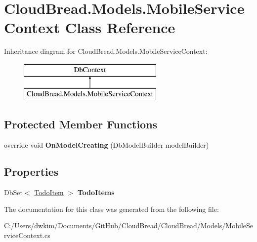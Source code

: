 \hypertarget{class_cloud_bread_1_1_models_1_1_mobile_service_context}{}\section{Cloud\+Bread.\+Models.\+Mobile\+Service\+Context Class Reference}
\label{class_cloud_bread_1_1_models_1_1_mobile_service_context}
Inheritance diagram for Cloud\+Bread.\+Models.\+Mobile\+Service\+Context\+:\begin{figure}[H]
\begin{center}
\leavevmode
\includegraphics[height=2.000000cm]{class_cloud_bread_1_1_models_1_1_mobile_service_context}
\end{center}
\end{figure}
\subsection*{Protected Member Functions}
\begin{DoxyCompactItemize}
\item 
override void {\bfseries On\+Model\+Creating} (Db\+Model\+Builder model\+Builder)\hypertarget{class_cloud_bread_1_1_models_1_1_mobile_service_context_a98c14d9e5b9403754d5b717f672ed77f}{}\label{class_cloud_bread_1_1_models_1_1_mobile_service_context_a98c14d9e5b9403754d5b717f672ed77f}

\end{DoxyCompactItemize}
\subsection*{Properties}
\begin{DoxyCompactItemize}
\item 
Db\+Set$<$ \hyperlink{class_cloud_bread_1_1_data_objects_1_1_todo_item}{Todo\+Item} $>$ {\bfseries Todo\+Items}\hypertarget{class_cloud_bread_1_1_models_1_1_mobile_service_context_aa02a40c8717cd4fa77923470c670f56d}{}\label{class_cloud_bread_1_1_models_1_1_mobile_service_context_aa02a40c8717cd4fa77923470c670f56d}

\end{DoxyCompactItemize}


The documentation for this class was generated from the following file\+:\begin{DoxyCompactItemize}
\item 
C\+:/\+Users/dwkim/\+Documents/\+Git\+Hub/\+Cloud\+Bread/\+Cloud\+Bread/\+Models/Mobile\+Service\+Context.\+cs\end{DoxyCompactItemize}
